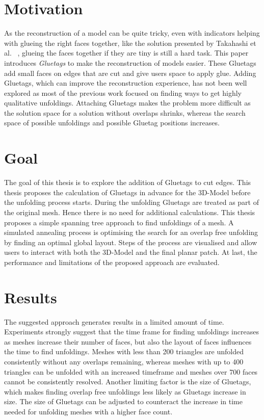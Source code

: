 \documentclass[draft,final]{vutinfth} %
\begin{document}
\section{Motivation}
As the reconstruction of a model can be quite tricky, even with indicators helping with glueing the right faces together, like the solution presented by Takahashi et al.
~\cite{takahashi2011optimized}, glueing the faces together if they are tiny is still a hard task.
This paper introduces \textit{Gluetags} to make the reconstruction of models easier. These Gluetags add small faces on edges that are cut and give users space to apply glue. Adding Gluetags, which can improve the reconstruction experience, has not been well explored as most of the previous work focused on finding ways to get highly qualitative unfoldings. Attaching Gluetags makes the problem more difficult as the solution space for a solution without overlaps shrinks, whereas the search space of possible unfoldings and possible Gluetag positions increases.

\section{Goal}
The goal of this thesis is to explore the addition of Gluetags to cut edges. This thesis proposes the calculation of Gluetags in advance for the 3D-Model before the unfolding process starts. During the unfolding Gluetags are treated as part of the original mesh. Hence there is no need for additional calculations. This thesis proposes a simple spanning tree approach to find unfoldings of a mesh. A simulated annealing process is optimising the search for an overlap free unfolding by finding an optimal global layout. Steps of the process are visualised and allow users to interact with both the 3D-Model and the final planar patch. At last, the performance and limitations of the proposed approach are evaluated.

\section{Results}
The suggested approach generates results in a limited amount of time. Experiments strongly suggest that the time frame for finding unfoldings increases as meshes increase their number of faces, but also the layout of faces influences the time to find unfoldings. Meshes with less than 200 triangles are unfolded consistently without any overlaps remaining, whereas meshes with up to 400 triangles can be unfolded with an increased timeframe and meshes over 700 faces cannot be consistently resolved. Another limiting factor is the size of Gluetags, which makes finding overlap free unfoldings less likely as Gluetags increase in size. The size of Gluetags can be adjusted to counteract the increase in time needed for unfolding meshes with a higher face count.
\end{document}
